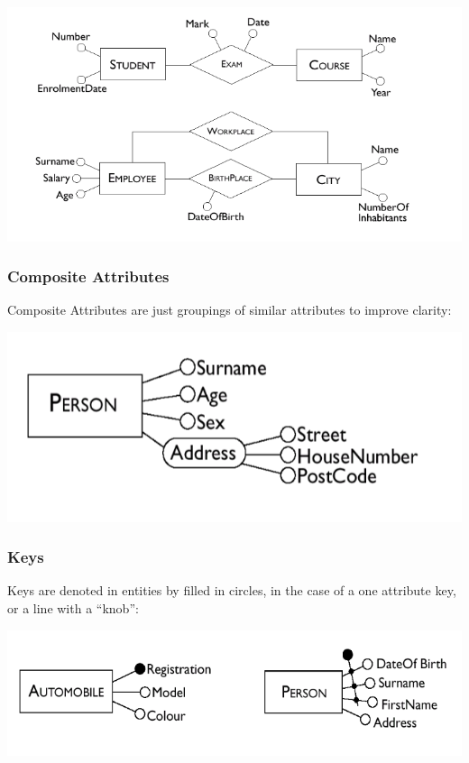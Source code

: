 \documentclass{report}
\begin{document}
\includegraphics[scale=.7]{2022-12-13-20-16-19.png}

\subsubsection{Composite Attributes}

\hspace{.5cm} Composite Attributes are just groupings of similar attributes to improve clarity:

\includegraphics[scale=.7]{2022-12-13-20-17-36.png}

\subsubsection{Keys}

\hspace{.5cm} Keys are denoted in entities by filled in circles, in the case of a one attribute key, or a line with a ``knob'':

\includegraphics[scale=.7]{2022-12-13-20-19-34.png}
\end{document}
